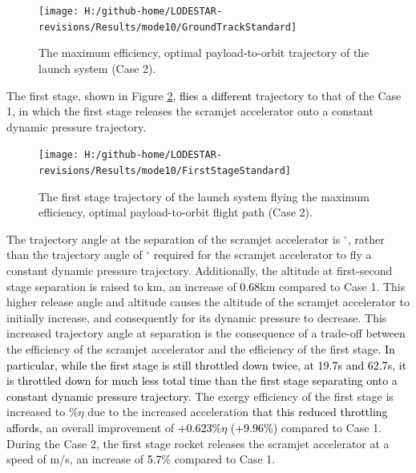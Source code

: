 \begin{figure}[ht!]%
	
	
	
	\centering
	\texttt{[image: H:/github-home/LODESTAR-revisions/Results/mode10/GroundTrackStandard]}
	\caption{The maximum efficiency, optimal payload-to-orbit trajectory of the launch system (Case 2).}
	\label{fig:GroundTrackStandardNoReturn}
\end{figure}


The first stage, shown in Figure \ref{fig:FirstStageStandardNoReturn}, \textcolor{black}{flies a different} trajectory to that of the Case 1, in which the first stage releases the scramjet accelerator onto a constant dynamic pressure trajectory.
\begin{figure}[ht!]%
	\centering
	\texttt{[image: H:/github-home/LODESTAR-revisions/Results/mode10/FirstStageStandard]}
	\caption{The first stage trajectory of the launch system flying the maximum efficiency, optimal payload-to-orbit flight path (Case 2).}
	\label{fig:FirstStageStandardNoReturn}
\end{figure}
 The trajectory angle at the separation of the scramjet accelerator is \secondthirdSeparationgammaqStandardNoReturn$^\circ$, rather than the trajectory angle of \secondthirdSeparationgammaConstqNoReturn$^\circ$ required for the scramjet accelerator to fly a constant dynamic pressure trajectory. Additionally, the altitude at first-second stage separation is raised to \firstsecondSeparationAltStandardNoReturn km, an increase of \textcolor{black}{0.68}km compared to Case 1. This higher release angle and altitude causes the altitude of the scramjet accelerator to initially increase, and consequently for its dynamic pressure to decrease. This increased trajectory angle at separation is the consequence of a trade-off between the efficiency of the scramjet accelerator and the efficiency of the first stage. \textcolor{black}{In particular, while the first stage is still throttled down twice, at 19.7s and 62.7s, it is throttled down for much less total time than the first stage separating onto a constant dynamic pressure trajectory.}
 The exergy efficiency of the first stage is increased to \firstExergyEffStandardNoReturn\%$\eta$ due to the increased acceleration \textcolor{black}{that this reduced throttling affords}, an overall improvement of \textcolor{black}{+0.623\%$\eta$ (+9.96\%)} compared to Case 1. 
 During the Case 2, the first stage rocket releases the scramjet accelerator at a speed of \firstsecondSeparationvStandardNoReturn m/s, an increase of \textcolor{black}{5.7}\% compared to Case 1.
